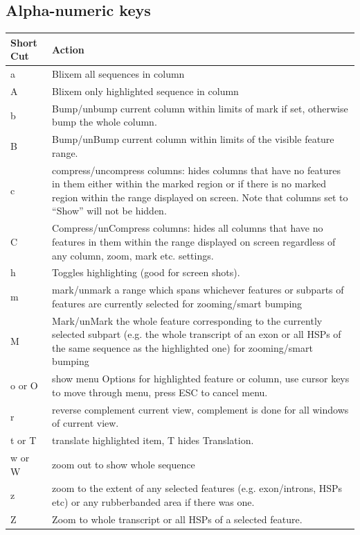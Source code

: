 \documentclass[letterpaper]{article}
\begin{document}
\subsection{Alpha-numeric keys}
\begin{supertabular}{|m{1.5cm}|m{13cm}|}
\hline
Short Cut & Action\\\hline
a & Blixem all sequences in column\\
A & Blixem only highlighted sequence in column\\
b & Bump/unbump current column within limits of mark if set, otherwise bump the whole column.\\
B & Bump/unBump current column within limits of the visible feature range.\\
c & compress/uncompress columns: hides columns that have no features in them either within the marked region or if there is no marked region within the range displayed on screen. Note that columns set to ``Show'' will not be hidden.\\
C & Compress/unCompress columns: hides all columns that have no features in them within the range displayed on screen regardless of any column, zoom, mark etc. settings.\\
h & Toggles highlighting (good for screen shots).\\
m & mark/unmark a range which spans whichever features or subparts of features are currently selected for zooming/smart bumping\\
M & Mark/unMark the whole feature corresponding to the currently selected subpart (e.g. the whole transcript of an exon or all HSPs of the same sequence as the highlighted one) for zooming/smart bumping\\
o or O & show menu Options for highlighted feature or column, use cursor keys to move through menu, press ESC to cancel menu.\\
r & reverse complement current view, complement is done for all windows of current view.\\
t or T & translate highlighted item, T hides Translation.\\
w or W & zoom out to show whole sequence\\
z & zoom to the extent of any selected features (e.g. exon/introns, HSPs etc) or any rubberbanded area if there was one.\\
Z & Zoom to whole transcript or all HSPs of a selected feature.\\
\hline
\end{supertabular}
\end{document}
